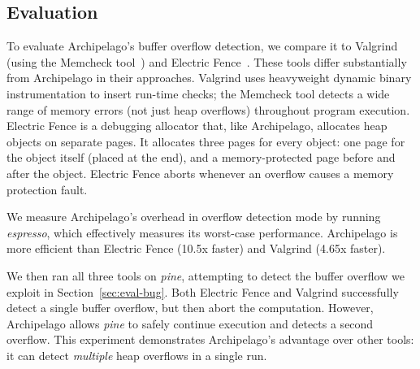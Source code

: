 \documentclass{acm_proc_article-sp}
\begin{document}
\newpage

\subsection{Evaluation}

\noindent
To evaluate Archipelago's buffer overflow detection, we compare it to
Valgrind (using the Memcheck tool~\cite{Sew:memcheck2005}) and
Electric Fence~\cite{efence}. These tools differ substantially from
Archipelago in their approaches. Valgrind uses heavyweight dynamic
binary instrumentation to insert run-time checks; the Memcheck tool
detects a wide range of memory errors (not just heap overflows)
throughout program execution. Electric Fence is a debugging allocator
that, like Archipelago, allocates heap objects on separate pages. It
allocates three pages for every object: one page for the object itself
(placed at the end), and a memory-protected page before and after the
object. Electric Fence aborts whenever an overflow causes a memory
protection fault.

We measure Archipelago's overhead in overflow detection mode by
running \emph{espresso}, which effectively measures its worst-case
performance. Archipelago is more efficient than Electric Fence (10.5x
faster) and Valgrind (4.65x faster).

We then ran all three tools on \emph{pine}, attempting to detect the
buffer overflow we exploit in Section~\ref{sec:eval-bug}. Both
Electric Fence and Valgrind successfully detect a single buffer
overflow, but then abort the computation. However, Archipelago allows
\emph{pine} to safely continue execution and detects a second overflow. 
This experiment demonstrates Archipelago's advantage over other tools:
it can detect \emph{multiple} heap overflows in a single run.

\end{document}
